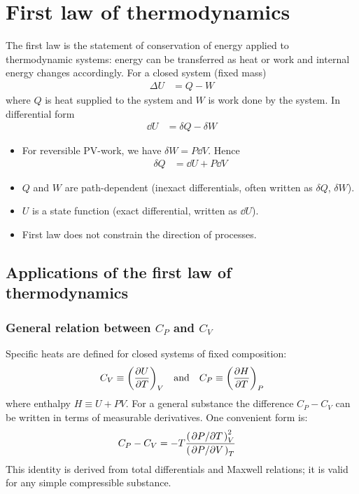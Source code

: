 \section{First law of thermodynamics}

	The first law is the statement of conservation of energy applied to thermodynamic systems: energy can be transferred as heat or work and internal energy changes accordingly. For a closed system (fixed mass)
	\begin{align*}
		\Delta U&=Q-W
	\end{align*}
	where $Q$ is heat supplied to the system and $W$ is work done by the system. In differential form
	\begin{align*}
		\dd{U}&=\delta{Q}-\delta{W}
	\end{align*}
	\begin{itemize}
		\item For reversible PV-work, we have $\delta{W}=P\dd{V}$. Hence
		\begin{align*}
			\delta{Q}&=\dd{U}+P\dd{V}
		\end{align*}
		
		\item $Q$ and $W$ are path-dependent (inexact differentials, often written as $\delta{Q}$, $\delta{W}$).
		
		\item $U$ is a state function (exact differential, written as $\dd{U}$).
		
		\item First law does not constrain the direction of processes.
	\end{itemize}
	
	\subsection{Applications of the first law of thermodynamics}
	
		\subsubsection{General relation between $C_P$ and $C_V$}
			Specific heats are defined for closed systems of fixed composition:
			\begin{align*}
				C_V\equiv\qty(\pdv{U}{T})_V\qq{and}C_P\equiv\qty(\pdv{H}{T})_P
			\end{align*}
			where enthalpy $H\equiv U+PV$. For a general substance the difference $C_P-C_V$ can be written in terms of measurable derivatives. One convenient form is:
			\begin{align*}
				C_P-C_V&=-T\dfrac{\qty(\pdv*{P}{T})_V^2}{\qty(\pdv*{P}{V})_T}
			\end{align*}
			This identity is derived from total differentials and Maxwell relations; it is valid for any simple compressible substance.
			

